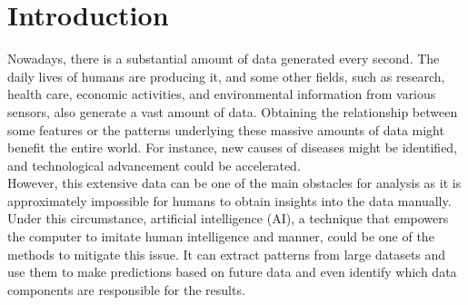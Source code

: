 \documentclass[12pt,twoside]{report}
\date{June 2022}
\begin{document}



\clearpage{\pagestyle{empty}\cleardoublepage}
\setcounter{page}{1}
\pagestyle{plain}


\cleardoublepage

\clearpage{\pagestyle{empty}\cleardoublepage}

\tableofcontents 


\clearpage{\pagestyle{empty}\cleardoublepage}
\setcounter{page}{1}
\fancyhead[LE,RO]{\slshape \rightmark}
\fancyhead[LO,RE]{\slshape \leftmark}

\chapter{Introduction}

Nowadays, there is a substantial amount of data generated every second. The daily lives of humans are producing it, and some other fields, such as research, health care, economic activities, and environmental information from various sensors, also generate a vast amount of data. Obtaining the relationship between some features or the patterns underlying these massive amounts of data might benefit the entire world. For instance, new causes of diseases might be identified, and technological advancement could be accelerated.
\\

However, this extensive data can be one of the main obstacles for analysis as it is approximately impossible for humans to obtain insights into the data manually. Under this circumstance, artificial intelligence (AI), a technique that empowers the computer to imitate human intelligence and manner,  could be one of the methods to mitigate this issue. It can extract patterns from large datasets and use them to make predictions based on future data and even identify which data components are responsible for the results.
\\
\end{document}
